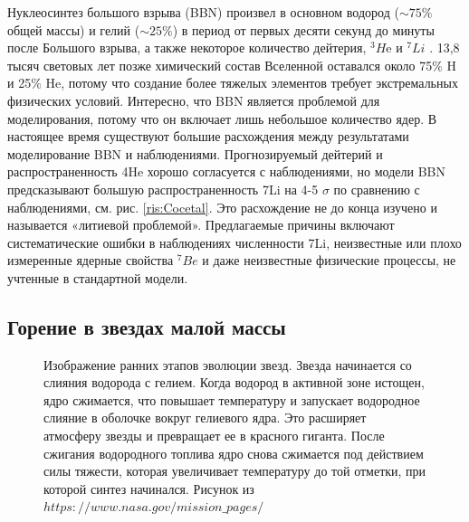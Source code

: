 \documentclass[%
master,    %
natbib,      %
subf,        %
href,        %
colorlinks,  %
]{disser}
\begin{document}
Нуклеосинтез большого взрыва (BBN) произвел в основном водород ($\sim75\%$ общей массы) и гелий ($\sim25\%$) в период от первых десяти секунд до минуты после Большого взрыва, а также некоторое количество дейтерия, $^3H$e и $^7Li$ \cite{Tytler}. 13,8 тысяч световых лет позже химический состав Вселенной оставался около 75$\%$ H и 25$\%$ He, потому что создание более тяжелых элементов требует экстремальных физических условий. Интересно, что BBN является проблемой для моделирования, потому что он включает лишь небольшое количество ядер. В настоящее время существуют большие расхождения между результатами моделирование BBN и наблюдениями. Прогнозируемый дейтерий и распространенность 4He хорошо согласуется с наблюдениями, но модели BBN предсказывают большую распространенность 7Li на 4-5 $\sigma$ по сравнению с наблюдениями, см. рис. \ref{ris:Cocetal}. Это расхождение не до конца изучено и называется «литиевой проблемой». Предлагаемые причины включают систематические ошибки в наблюдениях численности 7Li, неизвестные или плохо измеренные ядерные свойства $^{7}Be$ и даже неизвестные физические процессы, не учтенные в стандартной модели.

\subsection{Горение в звездах малой массы}

\begin{figure}[h]
	\caption{Изображение ранних этапов эволюции звезд. Звезда начинается со слияния	водорода с гелием. Когда водород в активной зоне истощен, ядро сжимается, что повышает температуру и запускает водородное слияние в оболочке вокруг гелиевого ядра. Это расширяет атмосферу звезды и превращает ее в красного гиганта. После сжигания водородного топлива ядро снова сжимается под действием силы тяжести, которая увеличивает температуру до той отметки, при которой синтез начинался. Рисунок из $https://www.nasa.gov/mission\_pages/$}
	\label{ris:evolution}
\end{figure}
\end{document}
